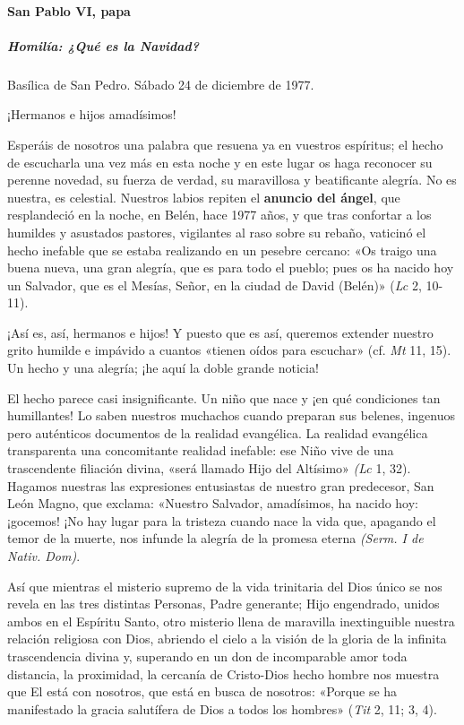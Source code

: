 \documentclass[]{article}
\let\oldparagraph\paragraph
\renewcommand{\paragraph}[1]{\oldparagraph{#1}\mbox{}}
\let\oldsubparagraph\subparagraph
\renewcommand{\subparagraph}[1]{\oldsubparagraph{#1}\mbox{}}
\begin{document}
\paragraph{San Pablo VI, papa}\label{san-pablo-vi-papa}

\subparagraph{Homilía: ¿Qué es la
Navidad?}\label{homiluxeda-quuxe9-es-la-navidad}

Basílica de San Pedro. Sábado 24 de diciembre de 1977.

¡Hermanos e hijos amadísimos!

Esperáis de nosotros una palabra que resuena ya en vuestros espíritus;
el hecho de escucharla una vez más en esta noche y en este lugar os haga
reconocer su perenne novedad, su fuerza de verdad, su maravillosa y
beatificante alegría. No es nuestra, es celestial. Nuestros labios
repiten el \textbf{anuncio del ángel}, que resplandeció en la noche, en
Belén, hace 1977 años, y que tras confortar a los humildes y asustados
pastores, vigilantes al raso sobre su rebaño, vaticinó el hecho inefable
que se estaba realizando en un pesebre cercano: «Os traigo una buena
nueva, una gran alegría, que es para todo el pueblo; pues os ha nacido
hoy un Salvador, que es el Mesías, Señor, en la ciudad de David (Belén)»
(\emph{Lc} 2, 10-11).

¡Así es, así, hermanos e hijos! Y puesto que es así, queremos extender
nuestro grito humilde e impávido a cuantos «tienen oídos para escuchar»
(cf. \emph{Mt} 11, 15). Un hecho y una alegría; ¡he aquí la doble grande
noticia!

El hecho parece casi insignificante. Un niño que nace y ¡en qué
condiciones tan humillantes! Lo saben nuestros muchachos cuando preparan
sus belenes, ingenuos pero auténticos documentos de la realidad
evangélica. La realidad evangélica transparenta una concomitante
realidad inefable: ese Niño vive de una trascendente filiación divina,
«será llamado Hijo del Altísimo» \emph{(Lc} 1, 32). Hagamos nuestras las
expresiones entusiastas de nuestro gran predecesor, San León Magno, que
exclama: «Nuestro Salvador, amadísimos, ha nacido hoy: ¡gocemos! ¡No hay
lugar para la tristeza cuando nace la vida que, apagando el temor de la
muerte, nos infunde la alegría de la promesa eterna \emph{(Serm. I de
Nativ. Dom)}.

Así que mientras el misterio supremo de la vida trinitaria del Dios
único se nos revela en las tres distintas Personas, Padre generante;
Hijo engendrado, unidos ambos en el Espíritu Santo, otro misterio llena
de maravilla inextinguible nuestra relación religiosa con Dios, abriendo
el cielo a la visión de la gloria de la infinita trascendencia divina y,
superando en un don de incomparable amor toda distancia, la proximidad,
la cercanía de Cristo-Dios hecho hombre nos muestra que El está con
nosotros, que está en busca de nosotros: «Porque se ha manifestado la
gracia salutífera de Dios a todos los hombres» (\emph{Tit} 2, 11; 3, 4).
\end{document}
